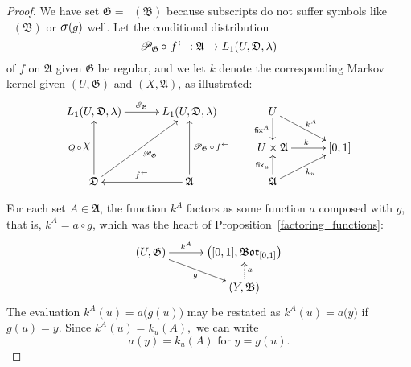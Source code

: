 \documentclass[
twoside=true,
paper=letter,
fontsize=9pt,
pagesize=auto,
leqno,
openany,
headsepline,
overfullrule,
]{scrbook}
\theoremstyle{plain}
\theoremstyle{plain}
\theoremstyle{definition}
\theoremstyle{bfnoteitalic}
\theoremstyle{bfnoteroman}
\newcommand{\sigalg}[1]{\mathfrak{#1}}
\newcommand{\cali}[1]{\mathscr{#1}}
\newcommand{\sfop}[1]{\mathsf{#1}}
\newcommand{\condexpop}[1]{\mathop{\cali{E}\hspace{-1pt}}\nolimits_{#1}}
\newcommand{\condprobop}[1]{\mathop{\cali{P}\hspace{-1pt}}\nolimits_{#1}}
\newcommand{\borel}{\mathfrak{Bor}}
\newcommand{\sagb}{\mathop{\hbox{\large{$\sigma$}}}\nolimits}
\newcommand{\charfunction}[1]{\mathop{{\raisebox{2pt}{$\chi$}}_{#1}}}
\newcommand{\preimage}[1]{\mathop{#1^{\leftarrow}}}
\newcommand{\sigmaalgebra}{\sigalg{A}}
\newcommand{\sigmaalgebraii}{\sigalg{B}}
\newcommand{\funca}{a}
\newcommand{\funcg}{g}
\newcommand{\funck}{k}
\newcommand{\function}{f}
\newcommand{\measurespace}{X}
\newcommand{\measurespaceii}{Y}
\newcommand{\mspaceeltii}{y}
\newcommand{\measureiii}{\lambda}
\newcommand{\seti}{A}
\newcommand{\fixinthefirst}[1]{\sfop{fix}_{#1}}
\newcommand{\fixinthesecond}[1]{\sfop{fix}^{#1}}
\newcommand{\uspace}{U}%
\newcommand{\uspaceelt}{u}
\newcommand{\uspacesig}{\sigalg{D}}
\begin{document}
\begin{proof}
We have set
$\sigalg{G} = \preimage{\funcg}(\sigmaalgebraii)$ because
subscripts do not suffer symbols like
$\preimage{\funcg}(\sigmaalgebraii)$ or $\sagb(\funcg)$
well.
Let the conditional distribution
\[
\condprobop{\sigalg{G}}\circ\, \preimage{\function}:
\sigmaalgebra \to L_1(\uspace,\uspacesig,\measureiii)
\]
of $\function$ on $\sigmaalgebra$ given $\sigalg{G}$
be regular, and we let
$\funck$
denote the corresponding Markov kernel given
$(\uspace,\sigalg{G})$ and $(\measurespace,\sigmaalgebra)$, as illustrated:
\[%
\xymatrix@R=16pt@C=30pt{
L_1(\uspace, \uspacesig, \measureiii) \ar[r]^{\condexpop{\sigalg{G}}}
& L_1(\uspace, \uspacesig, \measureiii)
& \uspace
\ar[d]_-{\fixinthesecond{\seti}}
\ar[dr]^{\funck^\seti}
\\
&
& \uspace\times\sigmaalgebra \ar[r]^{\funck}
& [0,1]
\\
\uspacesig
\ar[uu]^{Q\,\circ\,\charfunction{}}
\ar[uur]_{\condprobop{\sigalg{G}}}
& \sigmaalgebra
\ar[uu]_{\condprobop{\sigalg{G}}\circ \preimage{\function}}
\ar[l]_{\preimage{\function}}
& \sigmaalgebra
\ar[u]^{\fixinthefirst{\uspaceelt}}
\ar[ur]_{\funck_\uspaceelt}
&
\\
}
\]

For each set $\seti\in\sigmaalgebra$, the function
$\funck^\seti$ factors as some function $\funca$ composed with $\funcg$,
that is, $\funck^\seti= \funca \circ \funcg$,
which was the heart of Proposition~\ref{factoring_functions}:
\[
\xymatrix@R=14pt@C=30pt{
(\uspace,\sigalg{G})
\ar[r]^-{\funck^\seti}
\ar[dr]_{\funcg}
& \bigl([0,1],\borel_{[0,1]}\bigr) \\
 & (\measurespaceii,\sigmaalgebraii) \ar@{.>}[u]_{\funca}\\
}
\]
The evaluation
$\funck^\seti(\uspaceelt)
=
a\bigl(\funcg(\uspaceelt)\bigr)$
may be restated as
$\funck^\seti(\uspaceelt)
=
a\bigl(\mspaceeltii)$
if
$\funcg(\uspaceelt)
=
\mspaceeltii$.
Since $\funck^\seti(\uspaceelt) = \funck_\uspaceelt(\seti),$
we can write
\[
a(\mspaceeltii)=\funck_\uspaceelt(\seti) \text{ for } \mspaceeltii = \funcg(\uspaceelt).
\]


\end{proof}
\end{document}
